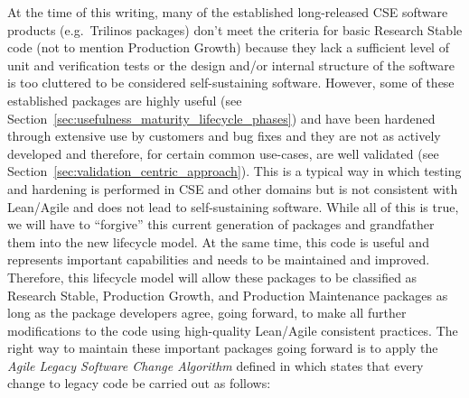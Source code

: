 \documentclass[11pt]{SANDreport}
\begin{document}
At the time of this writing, many of the established long-released CSE
software products (e.g.\ Trilinos packages) don't meet the criteria
for basic Research Stable code (not to mention Production Growth)
because they lack a sufficient level of unit and verification tests or
the design and/or internal structure of the software is too cluttered
to be considered self-sustaining software.  However, some of these
established packages are highly useful (see
Section~\ref{sec:usefulness_maturity_lifecycle_phases}) and have been
hardened through extensive use by customers and bug fixes and they are
not as actively developed and therefore, for certain common use-cases,
are well validated (see
Section~\ref{sec:validation_centric_approach}).  This is a typical way
in which testing and hardening is performed in CSE and other domains
but is not consistent with Lean/Agile and does not lead to
self-sustaining software.  While all of this is true, we will have to
``forgive'' this current generation of packages and grandfather them
into the new lifecycle model.  At the same time, this code is useful
and represents important capabilities and needs to be maintained and
improved.  Therefore, this lifecycle model will allow these packages
to be classified as Research Stable, Production Growth, and Production
Maintenance packages as long as the package developers agree, going
forward, to make all further modifications to the code using
high-quality Lean/Agile consistent practices.  The right way to
maintain these important packages going forward is to apply the
{}\textit{Agile Legacy Software Change Algorithm} defined in
{}\cite{WorkingEffectivelyWithLegacyCode05} which states that every
change to legacy code be carried out as follows:
\end{document}
